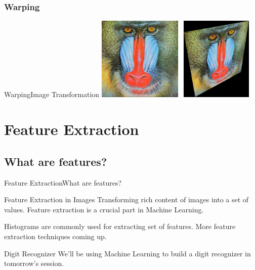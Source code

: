 \documentclass{beamer}
\begin{document}
\subsubsection{Warping}
\begin{frame}{Warping}{Image Transformation}
\centering \includegraphics[width=40mm,height=40mm]{images/baboon.jpg}\includegraphics[width=40mm,height=40mm]{images/warped.png}

\end{frame}

\section{Feature Extraction}
\subsection{What are features?}
\begin{frame}{Feature Extraction}{What are features?}
\begin{block}{Feature Extraction in Images}
Transforming rich content of images into a set of values. Feature extraction is a crucial part in Machine Learning.
\end{block}
\pause
\begin{example}
Histograms are commonly used for extracting set of features. More feature extraction techniques coming up.
\end{example}

\pause
\begin{block}{Digit Recognizer}
We'll be using Machine Learning to build a digit recognizer in tomorrow's session. 
\end{block}

\end{frame}
\end{document}
